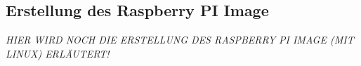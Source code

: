 \subsection{Erstellung des Raspberry PI Image}
\textit{HIER WIRD NOCH DIE ERSTELLUNG DES RASPBERRY PI IMAGE (MIT LINUX) ERLÄUTERT!}